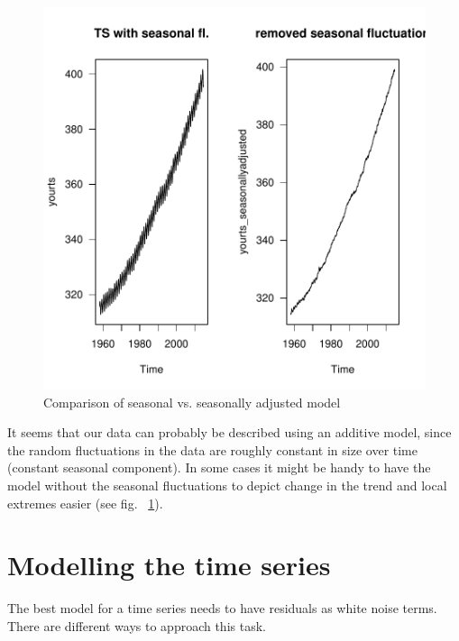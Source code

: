 \documentclass[11pt, a4paper]{article} %
\begin{document}
\begin{figure}[H]
\centering
\begin{Schunk}
\end{Schunk}
\includegraphics{alleselena-seasonallyadjusted}
\caption{Comparison of seasonal vs. seasonally adjusted model}
\label{decomposition2}
\end{figure}
\noindent It seems that our data can probably be described using an additive model, since the random fluctuations in the data are roughly constant in size over time (constant seasonal component). In some cases it might be handy to have the model without the seasonal fluctuations to depict change in the trend and local extremes easier (see fig. ~\ref{decomposition2}).

\section{Modelling the time series}
The best model for a time series needs to have residuals as white noise terms.
There are different ways to approach this task.
\end{document}
